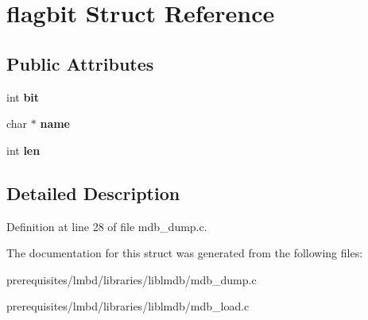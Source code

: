 \hypertarget{structflagbit}{}\section{flagbit Struct Reference}
\label{structflagbit}
\subsection*{Public Attributes}
\begin{DoxyCompactItemize}
\item 
\mbox{\label{structflagbit_a9f61aae8c279bfc54a9f37a229c40709}} 
int {\bfseries bit}
\item 
\mbox{\label{structflagbit_aafc4d7c5c0a0da8a068991ef143bbff5}} 
char $\ast$ {\bfseries name}
\item 
\mbox{\label{structflagbit_ac11348064cc1635432991449836d568b}} 
int {\bfseries len}
\end{DoxyCompactItemize}


\subsection{Detailed Description}


Definition at line 28 of file mdb\+\_\+dump.\+c.



The documentation for this struct was generated from the following files\+:\begin{DoxyCompactItemize}
\item 
prerequisites/lmbd/libraries/liblmdb/mdb\+\_\+dump.\+c\item 
prerequisites/lmbd/libraries/liblmdb/mdb\+\_\+load.\+c\end{DoxyCompactItemize}
